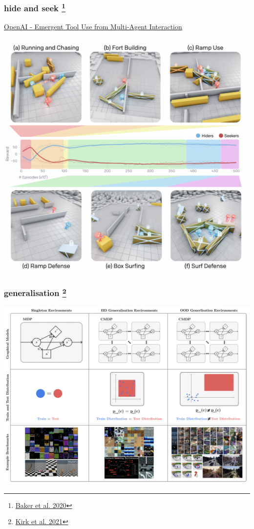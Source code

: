 \documentclass{beamer}
\begin{document}
\begin{frame}
  
  \frametitle{hide and seek \footnote{\href{https://arxiv.org/pdf/1909.07528.pdf}{Baker et al. 2020}}}
  \href{https://openai.com/blog/emergent-tool-use/}{OpenAI - Emergent Tool Use from Multi-Agent Interaction}

  \includegraphics[scale=0.3]{../images/hide_and_seek.png}

\end{frame}



\begin{frame}
  
  \frametitle{generalisation \footnote{\href{https://arxiv.org/pdf/2111.09794.pdf}{Kirk et al. 2021}}}
 
  \includegraphics[scale=0.25]{../images/generalisation.png}

\end{frame}
\end{document}
